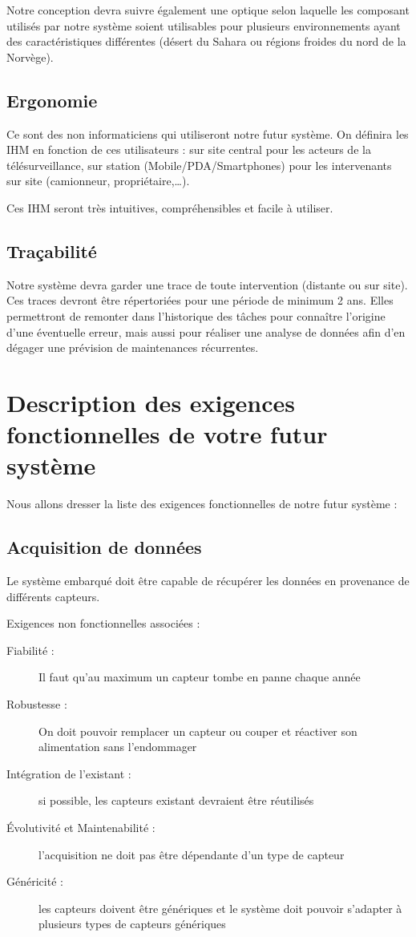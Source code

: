 \documentclass{mise_en_page}
\begin{document}
Notre conception devra suivre également une optique selon laquelle les
composant utilisés par notre système soient utilisables pour plusieurs
environnements ayant des caractéristiques différentes (désert du Sahara
ou régions froides du nord de la Norvège).

\subsection{Ergonomie}
Ce sont des non informaticiens qui utiliseront notre futur système. On
définira les IHM en fonction de ces utilisateurs : sur site central
pour les acteurs de la télésurveillance, sur station
(Mobile/PDA/Smartphones) pour les intervenants sur site (camionneur,
propriétaire,…).

Ces IHM seront très intuitives, compréhensibles et facile à utiliser.

\subsection{Traçabilité}
Notre système devra garder une trace de toute intervention (distante ou
sur site). Ces traces devront être répertoriées pour une période de
minimum 2 ans. Elles permettront de remonter dans l’historique des
tâches pour connaître l’origine d’une éventuelle erreur, mais aussi
pour réaliser une analyse de données afin d’en dégager une prévision de
maintenances récurrentes.

\section{Description des exigences fonctionnelles de votre futur
système }
Nous allons dresser la liste des exigences fonctionnelles de notre futur
système :

\subsection{Acquisition de données}
Le système embarqué doit être capable de récupérer les données en
provenance de différents capteurs.

Exigences non fonctionnelles associées :

\begin{description}
\item[Fiabilité :] Il faut qu’au maximum un capteur tombe en panne chaque
année
\item[Robustesse :] On doit pouvoir remplacer un capteur ou couper et
réactiver son alimentation sans l’endommager
\item[Intégration de l’existant :] si possible, les capteurs existant
devraient être réutilisés
\item[Évolutivité et Maintenabilité :] l’acquisition ne doit pas être
dépendante d’un type de capteur
\item[Généricité :] les capteurs doivent être génériques et le système
doit pouvoir s’adapter à plusieurs types de capteurs génériques
\end{description}
\end{document}
